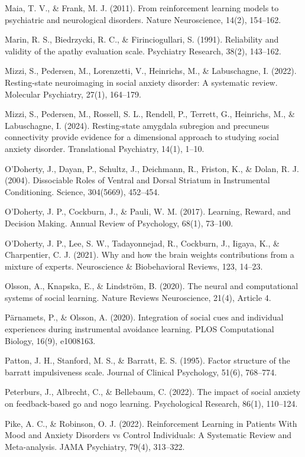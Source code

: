 \documentclass[12pt,a4paper,oneside,]{book} %
\begin{document}
Maia, T. V., \& Frank, M. J. (2011). From reinforcement learning models to psychiatric and neurological disorders. Nature Neuroscience, 14(2), 154--162.

Marin, R. S., Biedrzycki, R. C., \& Firinciogullari, S. (1991). Reliability and validity of the apathy evaluation scale. Psychiatry Research, 38(2), 143--162.

Mizzi, S., Pedersen, M., Lorenzetti, V., Heinrichs, M., \& Labuschagne, I. (2022). Resting-state neuroimaging in social anxiety disorder: A systematic review. Molecular Psychiatry, 27(1), 164--179.

Mizzi, S., Pedersen, M., Rossell, S. L., Rendell, P., Terrett, G., Heinrichs, M., \& Labuschagne, I. (2024). Resting-state amygdala subregion and precuneus connectivity provide evidence for a dimensional approach to studying social anxiety disorder. Translational Psychiatry, 14(1), 1--10.

O'Doherty, J., Dayan, P., Schultz, J., Deichmann, R., Friston, K., \& Dolan, R. J. (2004). Dissociable Roles of Ventral and Dorsal Striatum in Instrumental Conditioning. Science, 304(5669), 452--454.

O'Doherty, J. P., Cockburn, J., \& Pauli, W. M. (2017). Learning, Reward, and Decision Making. Annual Review of Psychology, 68(1), 73--100.

O'Doherty, J. P., Lee, S. W., Tadayonnejad, R., Cockburn, J., Iigaya, K., \& Charpentier, C. J. (2021). Why and how the brain weights contributions from a mixture of experts. Neuroscience \& Biobehavioral Reviews, 123, 14--23.

Olsson, A., Knapska, E., \& Lindström, B. (2020). The neural and computational systems of social learning. Nature Reviews Neuroscience, 21(4), Article 4.

Pärnamets, P., \& Olsson, A. (2020). Integration of social cues and individual experiences during instrumental avoidance learning. PLOS Computational Biology, 16(9), e1008163.

Patton, J. H., Stanford, M. S., \& Barratt, E. S. (1995). Factor structure of the barratt impulsiveness scale. Journal of Clinical Psychology, 51(6), 768--774.

Peterburs, J., Albrecht, C., \& Bellebaum, C. (2022). The impact of social anxiety on feedback-based go and nogo learning. Psychological Research, 86(1), 110--124.

Pike, A. C., \& Robinson, O. J. (2022). Reinforcement Learning in Patients With Mood and Anxiety Disorders vs Control Individuals: A Systematic Review and Meta-analysis. JAMA Psychiatry, 79(4), 313--322.
\end{document}

